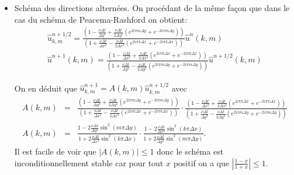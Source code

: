 \documentclass[12pt,a4paper]{article}
\begin{document}
\begin{itemize}
\item Schéma des directions alternées. On procédant de la même façon que dans le cas du schéma de Peacema-Rashford on obtient:
$$
\begin{array}{l}
\displaystyle \hat{u}^{n+1/2}_{k,m}   =  \frac{\left(1 -  \frac{\nu\Delta t}{\Delta y^2} +\frac{\nu\Delta t}{2\Delta y^2} (e^{2i\pi m\Delta y}+e^{-2i\pi m\Delta y}) \right)}{\left(1 + \frac{\nu\Delta t}{\Delta x^2}   - \frac{\nu\Delta t}{2\Delta x^2} (e^{2i\pi k \Delta x}+e^{-2i\pi k\Delta x})\right) } \hat{u}^{n}(k,m) \\[3ex]
\displaystyle \hat{u}^{n+1}(k,m)  = \frac{ \left(1 -  \frac{\nu\Delta t}{\Delta x^2} +\frac{\nu\Delta t}{2\Delta x^2} (e^{2i\pi k\Delta x}+e^{-2i\pi k\Delta x}) \right)}{ \left(1 + \frac{\nu\Delta t}{\Delta y^2}   - \frac{\nu\Delta t}{2\Delta y^2} (e^{2i\pi m \Delta y}+e^{-2i\pi m\Delta y})\right) } \hat{u}^{n+1/2}(k,m)
\end{array}
$$

On en déduit que $\hat{u}^{n+1}_{k,m} = A(k,m) \hat{u}^{n+1/2}_{k,m}$ avec
$$
\begin{array}{rcl}
A(k,m) &= & \displaystyle \frac{\left(1 -  \frac{\nu\Delta t}{\Delta y^2} +\frac{\nu\Delta t}{2\Delta y^2} (e^{2i\pi m\Delta y}+e^{-2i\pi m\Delta y}) \right)}{\left(1 + \frac{\nu\Delta t}{\Delta x^2}   - \frac{\nu\Delta t}{2\Delta x^2} (e^{2i\pi k \Delta x}+e^{-2i\pi k\Delta x})\right) } \cdot  \frac{ \left(1 -  \frac{\nu\Delta t}{\Delta x^2} +\frac{\nu\Delta t}{2\Delta x^2} (e^{2i\pi k\Delta x}+e^{-2i\pi k\Delta x}) \right)}{ \left(1 + \frac{\nu\Delta t}{\Delta y^2}   - \frac{\nu\Delta t}{2\Delta y^2} (e^{2i\pi m \Delta y}+e^{-2i\pi m\Delta y})\right) } \\
A(k,m) &= & \displaystyle \frac{1 -  2\frac{\nu\Delta t}{\Delta y^2} \sin^2(m\pi\Delta y) }{1 + 2\frac{\nu\Delta t}{\Delta x^2} \sin^2(k\pi\Delta x) } \cdot \frac{1 -  2\frac{\nu\Delta t}{\Delta x^2} \sin^2(k\pi\Delta x) }{1 + 2\frac{\nu\Delta t}{\Delta y^2} \sin^2(m\pi\Delta y) } .
\end{array}
$$
Il est facile de voir que $|A(k,m)|\le 1$ donc le schéma est inconditionnellement stable car pour tout $x$ positif on a que $\left|\frac{1-x}{1+x}\right| \le 1$.

\end{itemize}
\end{document}
